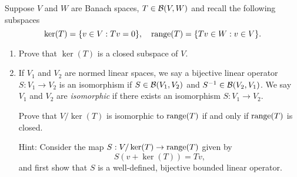 \documentclass[a4paper, 10pt]{article}
\begin{document}
\begin{problem} 
    Suppose $V$ and $W$ are Banach spaces, $T \in \mathcal{B}(V, W)$ and recall the following subspaces \begin{equation*}
    \ker(T) = \{v \in V : Tv = 0\}, \quad \operatorname*{range}(T) = \{Tv \in W : v \in V\}.
    \end{equation*}
    \begin{enumerate}
    \item Prove that $\ker(T)$ is a closed subspace of $V$.
    \item If $V_1$ and $V_2$ are normed linear spaces, we say a bijective linear operator $S: V_1 \to V_2$ is an isomorphism if $S \in \mathcal{B}(V_1, V_2)$ and ${S}^{-1} \in \mathcal{B}(V_2, V_1)$. We say $V_1$ and $V_2$ are \textit{isomorphic} if there exists an isomorphism $S: V_1 \to V_2$.
    
    Prove that $V/\ker(T)$ is isomorphic to $\operatorname*{range}(T)$ if and only if $\operatorname*{range}(T)$ is closed.

    Hint: Consider the map $S: V/\ker(T) \to \operatorname*{range}(T)$ given by \begin{equation*}
    S(v + \ker(T)) = Tv,
    \end{equation*}
    and first show that $S$ is a well-defined, bijective bounded linear operator.
    \end{enumerate}
\end{problem}
\end{document}
